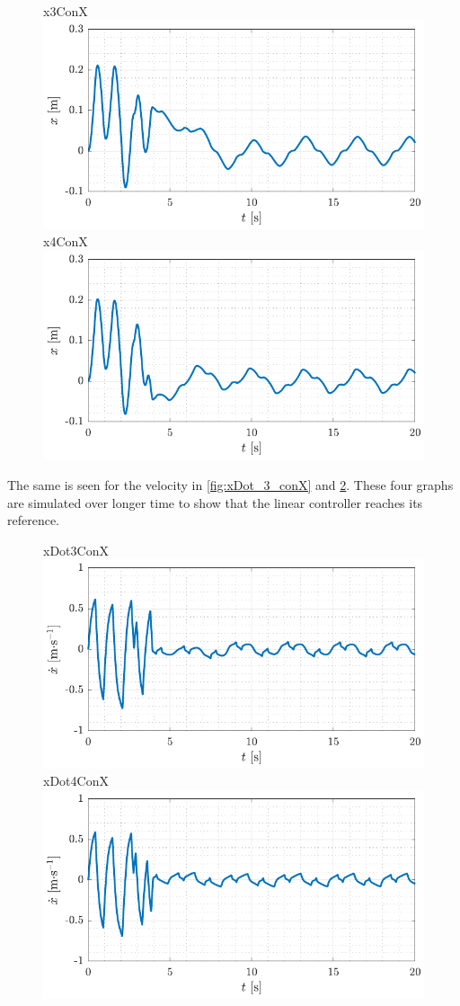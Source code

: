 \begin{figure}[H]
  \hspace{-10pt}
  \captionbox
  {
    x3ConX
    \label{fig:x_3_conX}
  }
  {
    \hspace{-1cm}
    \includegraphics[width=.4\textwidth]{figures/x_3_conX}
  }
  \hspace{20pt}
  \captionbox 
  {
    x4ConX
    \label{fig:x_4_conX}
  }
  {
    \hspace{-1cm}
    \includegraphics[width=.4\textwidth]{figures/x_4_conX}
  }  
\end{figure}
The same is seen for the velocity in \autoref{fig:xDot_3_conX} and \ref{fig:xDot_4_conX}. These four graphs are simulated over longer time to show that the linear controller reaches its reference.
\begin{figure}[H]
  \hspace{-10pt}
  \captionbox
  {
    xDot3ConX
    \label{fig:xDot_3_conX}
  }
  {
    \hspace{-1cm}
    \includegraphics[width=.4\textwidth]{figures/xDot_3_conX}
  }
  \hspace{20pt}
  \captionbox 
  {
    xDot4ConX
    \label{fig:xDot_4_conX}
  }
  {
    \hspace{-1cm}
    \includegraphics[width=.4\textwidth]{figures/xDot_4_conX}
  }  
\end{figure}







